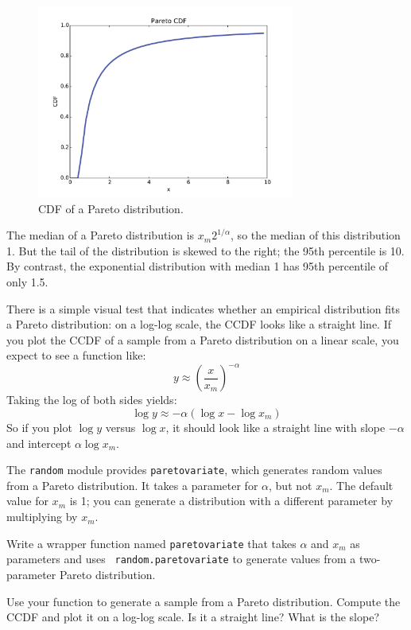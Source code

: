 \documentclass[12pt]{book}
\begin{document}
\begin{figure}
\centerline{\includegraphics[height=2.5in]{figs/pareto_cdf.pdf}}
\caption{CDF of a Pareto distribution.}
\label{pareto_cdf}
\end{figure}

The median of a Pareto distribution is $x_m 2^{1/\alpha}$, so the
median of this distribution 1.  But the tail of the distribution is
skewed to the right; the 95th percentile is 10.  By contrast, the
exponential distribution with median 1 has 95th percentile of only
1.5.  
  

There is a simple visual test that indicates whether an empirical
distribution fits a Pareto distribution: on a log-log scale, the CCDF
looks like a straight line.
If you plot the CCDF of a sample from a Pareto distribution on a
linear scale, you expect to see a function like:
%
\[ y \approx \left( \frac{x}{x_m} \right) ^{-\alpha} \]
%
Taking the log of both sides yields:
%
\[ \log y \approx -\alpha (\log x - \log x_{m})\]
%
So if you plot $\log y$ versus $\log x$, it should look like a straight
line with slope $-\alpha$ and intercept
$\alpha \log x_{m}$.

\begin{exercise}
The {\tt random} module provides {\tt paretovariate},
which generates random values from a Pareto distribution.  It takes
a parameter for $\alpha$, but not $x_{m}$.  The
default value for $x_{m}$ is 1; you can generate a distribution
with a different parameter by multiplying by $x_{m}$.

Write a wrapper function named {\tt paretovariate} that takes
$\alpha$ and $x_{m}$ as parameters and uses {\tt
  random.paretovariate} to generate values from a two-parameter Pareto
distribution.

Use your function to generate a sample from a Pareto distribution.
Compute the CCDF and plot it on a log-log scale.  Is it a straight
line?  What is the slope?

\end{exercise}
\end{document}
